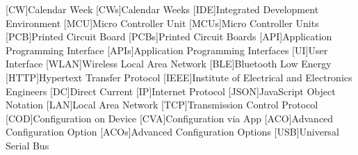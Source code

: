 % 
\begin{acronym}[STATCOM]    %
%
[CW]{Calendar Week}
[CWs]{Calendar Weeks}
%
[IDE]{Integrated Development Environment}
%
[MCU]{Micro Controller Unit}
[MCUs]{Micro Controller Units}
%
[PCB]{Printed Circuit Board}
[PCBs]{Printed Circuit Boards}
%
[API]{Application Programming Interface}
[APIs]{Application Programming Interfaces}
%
[UI]{User Interface}
%
[WLAN]{Wireless Local Area Network}
%
[BLE]{Bluetooth Low Energy}
%
[HTTP]{Hypertext Transfer Protocol}
%
[IEEE]{Institute of Electrical and Electronics Engineers}
%
[DC]{Direct Current}
%
[IP]{Internet Protocol}
%
[JSON]{JavaScript Object Notation}
%
[LAN]{Local Area Network}
%
[TCP]{Transmission Control Protocol}
%
[COD]{Configuration on Device}
%
[CVA]{Configuration via App}
%
[ACO]{Advanced Configuration Option}
[ACOs]{Advanced Configuration Options}
%
[USB]{Universal Serial Bus}
%
\end{acronym}
%
